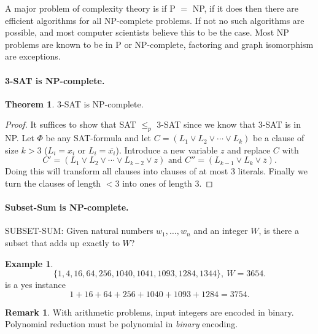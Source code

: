 \documentclass[11pt,a4paper]{article}
\theoremstyle{definition}
\newtheorem{thm}{Theorem}
\newtheorem*{ex}{Example}
\newtheorem*{rem}{Remark}
\begin{document}
A major problem of complexity theory is if P $=$ NP, if it does then there are efficient algorithms for all NP-complete problems.
If not no such algorithms are possible, and most computer scientists believe this to be the case.
Most NP problems are known to be in P or NP-complete, factoring and graph isomorphism are exceptions.

\paragraph{3-SAT is NP-complete.}
\begin{thm}
3-SAT is NP-complete.
\end{thm}
\begin{proof}
It suffices to show that SAT $\le_p$ 3-SAT since we know that 3-SAT is in NP.%
Let $\Phi$ be any SAT-formula and let $C = (L_1\vee L_2 \vee \cdots \vee L_k)$ be a clause of size $k > 3$ ($L_i = x_i$ or $L_i = \overline{x_i}$).
Introduce a new variable $z$ and replace $C$ with
\[
C' = (L_1 \vee L_2 \vee \cdots \vee L_{k-2} \vee z)\text{ and }C'' = (L_{k-1} \vee L_k \vee \overline{z}).
\]
Doing this will transform all clauses into clauses of at most 3 literals.
Finally we turn the clauses of length $< 3$ into ones of length 3.
\end{proof}

\paragraph{Subset-Sum is NP-complete.}
SUBSET-SUM: Given natural numbers $w_1,\ldots,w_n$ and an integer $W$, is there a subset that adds up exactly to $W$?

\begin{ex}
\[
\{1,4,16,64,256,1040,1041,1093,1284,1344\},\ W = 3654.
\]
is a yes instance
\[
1 + 16 + 64 + 256 + 1040 + 1093 + 1284 = 3754.
\]
\end{ex}

\begin{rem}
With arithmetic problems, input integers are encoded in binary.
Polynomial reduction must be polynomial in \emph{binary} encoding.
\end{rem}
\end{document}

